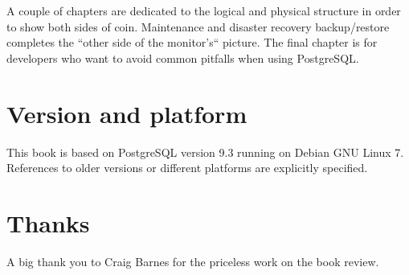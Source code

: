 \documentclass[oneside]{book}
\begin{document}
A couple of chapters are dedicated to the logical and physical structure in
order to show both sides of coin.  Maintenance and disaster recovery
backup/restore completes the ``other side of the monitor's`` picture.
The final chapter is for developers who want to avoid common pitfalls when
using PostgreSQL.

\section*{Version and platform}
This book is based on PostgreSQL version 9.3 running on Debian GNU Linux 7.
References to older versions or different platforms are explicitly specified.

\section*{Thanks}
A big thank you to Craig Barnes for the priceless work on the book review.











\appendix

\listoffigures
\listoftables
\printindex{}
\end{document}
